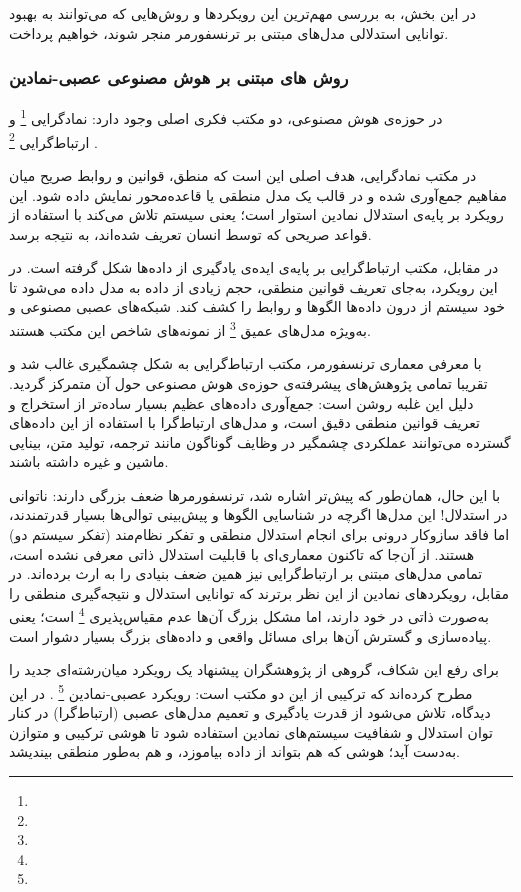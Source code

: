 در این بخش، به بررسی مهم‌ترین این رویکردها و روش‌هایی که می‌توانند به بهبود توانایی استدلالی مدل‌های مبتنی بر ترنسفورمر منجر شوند، خواهیم پرداخت.

\subsubsection{
روش های مبتنی بر هوش مصنوعی عصبی-نمادین
}
در حوزه‌ی هوش مصنوعی، دو مکتب فکری اصلی وجود دارد: نمادگرایی
\footnote{}
و ارتباط‌گرایی
\footnote{}
.

در مکتب نمادگرایی، هدف اصلی این است که منطق، قوانین و روابط صریح میان مفاهیم جمع‌آوری شده و در قالب یک مدل منطقی یا قاعده‌محور نمایش داده شود. این رویکرد بر پایه‌ی استدلال نمادین استوار است؛ یعنی سیستم تلاش می‌کند با استفاده از قواعد صریحی که توسط انسان تعریف شده‌اند، به نتیجه برسد.

در مقابل، مکتب ارتباط‌گرایی بر پایه‌ی ایده‌ی یادگیری از داده‌ها شکل گرفته است. در این رویکرد، به‌جای تعریف قوانین منطقی، حجم زیادی از داده به مدل داده می‌شود تا خود سیستم از درون داده‌ها الگوها و روابط را کشف کند. شبکه‌های عصبی مصنوعی و به‌ویژه مدل‌های عمیق 
\footnote{}
از نمونه‌های شاخص این مکتب هستند.

با معرفی معماری ترنسفورمر، مکتب ارتباط‌گرایی به شکل چشمگیری غالب شد و تقریبا تمامی پژوهش‌های پیشرفته‌ی حوزه‌ی هوش مصنوعی حول آن متمرکز گردید. دلیل این غلبه روشن است:
جمع‌آوری داده‌های عظیم بسیار ساده‌تر از استخراج و تعریف قوانین منطقی دقیق است، و مدل‌های ارتباط‌گرا با استفاده از این داده‌های گسترده می‌توانند عملکردی چشمگیر در وظایف گوناگون مانند ترجمه، تولید متن، بینایی ماشین و غیره داشته باشند.

با این حال، همان‌طور که پیش‌تر اشاره شد، ترنسفورمرها ضعف بزرگی دارند: ناتوانی در استدلال!
این مدل‌ها اگرچه در شناسایی الگوها و پیش‌بینی توالی‌ها بسیار قدرتمندند، اما فاقد سازوکار درونی برای انجام استدلال منطقی و تفکر نظام‌مند (تفکر سیستم دو) هستند.
از آن‌جا که تاکنون معماری‌ای با قابلیت استدلال ذاتی معرفی نشده است، تمامی مدل‌های مبتنی بر ارتباط‌گرایی نیز همین ضعف بنیادی را به ارث برده‌اند.
در مقابل، رویکردهای نمادین از این نظر برترند که توانایی استدلال و نتیجه‌گیری منطقی را به‌صورت ذاتی در خود دارند، اما مشکل بزرگ آن‌ها عدم مقیاس‌پذیری
\footnote{}
است؛ یعنی پیاده‌سازی و گسترش آن‌ها برای مسائل واقعی و داده‌های بزرگ بسیار دشوار است.

برای رفع این شکاف، گروهی از پژوهشگران پیشنهاد یک رویکرد میان‌رشته‌ای جدید را مطرح کرده‌اند که ترکیبی از این دو مکتب است:
رویکرد عصبی-نمادین
\footnote{}
.
در این دیدگاه، تلاش می‌شود از قدرت یادگیری و تعمیم مدل‌های عصبی (ارتباط‌گرا) در کنار توان استدلال و شفافیت سیستم‌های نمادین استفاده شود تا هوشی ترکیبی و متوازن به‌دست آید؛ هوشی که هم بتواند از داده بیاموزد، و هم به‌طور منطقی بیندیشد.
\cite{b30}

